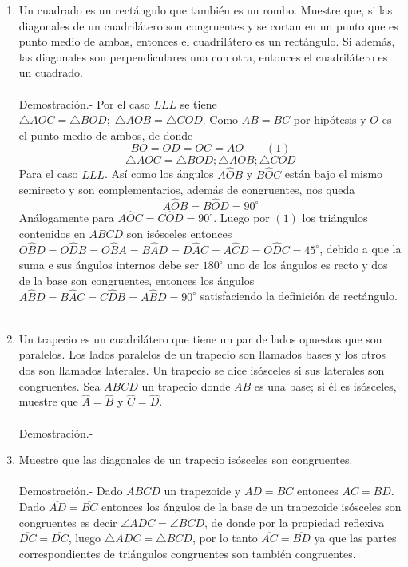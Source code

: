 \documentclass[10pt]{article}
\begin{document}
\begin{enumerate}
\item  Un cuadrado es un rectángulo que también es un rombo. Muestre que, si las diagonales de un cuadrilátero son congruentes y se cortan en un punto que es punto medio de ambas, entonces el cuadrilátero es un rectángulo. Si además, las diagonales son perpendiculares una con otra, entonces el cuadrilátero es un cuadrado.\\\\
    Demostración.-\; Por el caso $LLL$ se tiene $\triangle AOC = \triangle BOD; \; \triangle AOB = \triangle COD$. Como $AB=BC$ por hipótesis y $O$ es el punto medio de ambos, de donde $$BO=OD=OC=AO \qquad (1)$$ $$\triangle AOC = \triangle BOD; \triangle AOB; \triangle COD$$ Para el caso $LLL$. Así como los ángulos $A\widehat{O}B$ y $B\widehat{O}C$ están bajo el mismo semirecto y son complementarios, además de congruentes, nos queda $$A\widehat{O}B=B\widehat{O}D=90^{\circ}$$
    Análogamente para $A\widehat{O}C=C\widehat{O}D=90^{\circ}.$ Luego por $(1)$ los triángulos contenidos en $ABCD$ son isósceles entonces $O\widehat{B}D=O\widehat{D}B=O\widehat{B}A=B\widehat{A}D=D\widehat{A}C=A\widehat{C}D=O\widehat{D}C=45^{\circ}$, debido a que la suma e sus ángulos internos debe ser $180^{\circ}$ uno de los ángulos es recto y dos de la base son congruentes, entonces los ángulos $A\widehat{B}D=B\widehat{A}C=C\widehat{D}B=A\widehat{B}D=90^{\circ}$ satisfaciendo la definición de rectángulo.\\\\

\item Un trapecio es un cuadrilátero que tiene un par de lados opuestos que son paralelos. Los lados paralelos de un trapecio son llamados bases y  los otros dos son llamados laterales. Un trapecio se dice isósceles si sus laterales son congruentes. Sea $ABCD$ un trapecio donde $AB$ es  una base; si él es isósceles, muestre que $\widehat{A} = \widehat{B}$ y $\widehat{C} = \widehat{D}$.\\\\
    Demostración.-\;

\item Muestre que las diagonales de un trapecio isósceles son congruentes.\\\\
    Demostración.-\; Dado $ABCD$ un trapezoide y $\overline{AD}=\overline{BC}$ entonces $\overline{AC}=\overline{BD}$. Dado $\overline{AD}=\overline{BC}$ entonces los ángulos de la base de un trapezoide isósceles son congruentes es decir $\angle ADC = \angle BCD$, de donde por la propiedad reflexiva $\overline{DC}=\overline{DC}$, luego $\triangle ADC = \triangle BCD$, por lo tanto $\overline{AC}=\overline{BD}$ ya que las partes correspondientes de triángulos congruentes son también congruentes.\\\\


\end{enumerate}
\end{document}
